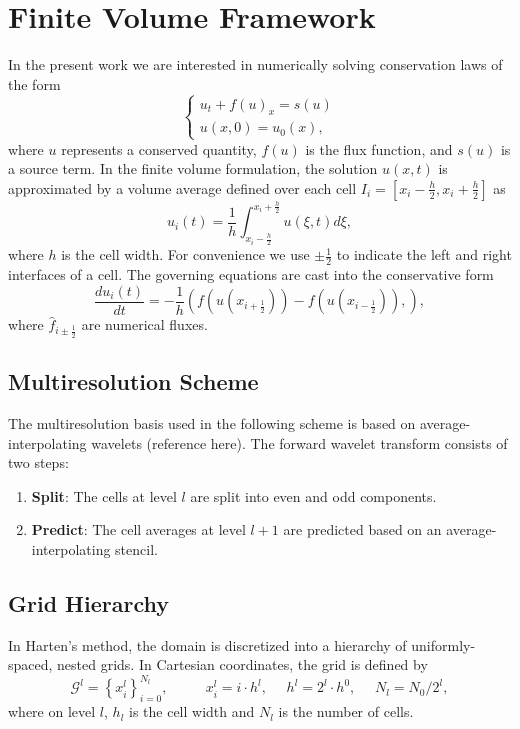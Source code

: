 \documentclass{article}
\begin{document}
\section{Finite Volume Framework}
In the present work we are interested in numerically solving conservation laws of the form
\begin{equation}
\begin{cases}
  u_{t} + f(u)_{x} = s(u) \\    
  u(x,0) = u_{0}(x),
\end{cases}
\end{equation}
where $u$ represents a conserved quantity, $f(u)$ is the flux function, and $s(u)$ is a source term. In the finite volume formulation, the solution $u(x,t)$ is approximated by a volume average defined over each cell $I_{i} = \left[ x_{i}-\frac{h}{2}, x_{i}+\frac{h}{2} \right]$ as
\begin{equation}
    u_{i}(t) = \frac{1}{h} \int_{x_{i}-\frac{h}{2}}^{x_{i}+\frac{h}{2}} u(\xi,t) d \xi,
\end{equation}
where $h$ is the cell width. For convenience we use $\pm \frac{1}{2}$ to indicate the left and right interfaces of a cell.
The governing equations are cast into the conservative form
\begin{equation}
    \frac{du_{i}(t)}{dt} = -\frac{1}{h} \left( f(u(x_{i+\frac{1}{2}})) - f(u(x_{i-\frac{1}{2}})), \right),
\end{equation}
where $\hat{f}_{i \pm \frac{1}{2}}$ are numerical fluxes.

\subsection{Multiresolution Scheme}
The multiresolution basis used in the following scheme is based on average-
interpolating wavelets (reference here). The forward wavelet transform consists
of two steps:
\begin{enumerate}
    \item[] \textbf{Split}: The cells at level $l$ are split into even and odd
            components.
    \item[] \textbf{Predict}: The cell averages at level $l+1$ are predicted based
            on an average-interpolating stencil.
\end{enumerate}

\subsection{Grid Hierarchy}
In Harten's method, the domain is discretized into a hierarchy of uniformly-spaced,
nested grids. In Cartesian coordinates, the grid is defined by
\begin{equation}
\mathcal{G}^{l} = \left\{ x_{i}^{l} \right\}_{i=0}^{N_{l}}, \text{ } \text{ } \text{ } \text{ } x_{i}^{l} = i \cdot h^{l}, \text{ } \text{ } h^{l} = 2^{l} \cdot h^{0}, \text{ } \text{ } N_{l} = N_{0} / 2^{l},
\end{equation}
where on level $l$, $h_{l}$ is the cell width and $N_{l}$ is the number of cells.
\end{document}
